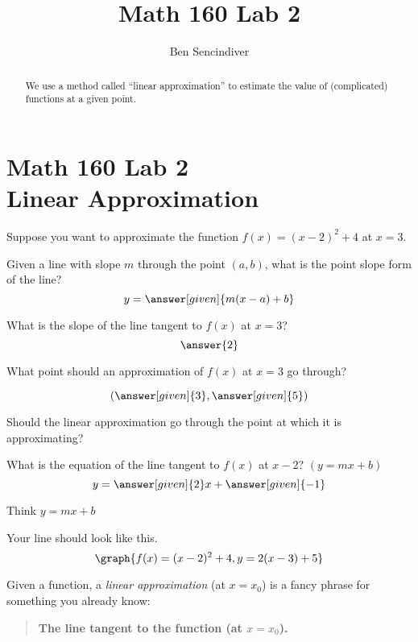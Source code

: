 \documentclass[handout,nooutcomes]{ximera}
\title{Math 160 Lab 2}
\author{Ben Sencindiver} %
\begin{document}
\section{Math 160 Lab 2 \\ Linear Approximation}

\begin{abstract}
We use a method called ``linear approximation'' to estimate the value
of (complicated) functions at a given point.
\end{abstract}

\maketitle

\begin{question}
Suppose you want to approximate the function $f(x) = (x-2)^2  + 4$ at $x=3$.

Given a line with slope $m$ through the point $(a, b)$, what is the point slope form of the line?
\[
y = \answer[given]{m(x - a) + b}
\]

What is the slope of the line tangent to $f(x)$ at $x=3$?
\[
\answer{2}
\]

What point should an approximation of $f(x)$ at $x=3$ go through?

\[
(\answer[given]{3}, \answer[given]{5})
\]
\begin{hint}
Should the linear approximation go through the point at which it is approximating?
\end{hint}


\begin{problem}
What is the equation of the line tangent to $f(x)$ at $x-2$? $(y=mx+b)$
\[
y = \answer[given]{2}x + \answer[given]{-1}
\]
\begin{hint}
Think $y=mx+b$
\end{hint}

\begin{feedback}
Your line should look like this.
\[
\graph{f(x) = (x-2)^2+4, y = 2(x-3) + 5}
\]
\end{feedback}
\end{problem}





Given a function, a \textit{linear approximation} (at $x=x_0$) is a fancy phrase
for something you already know:
\begin{center}
\begin{quote}
  \textbf{The line tangent to the function (at $x=x_0$).}
\end{quote}
\end{center}



\end{question}
\end{document}
